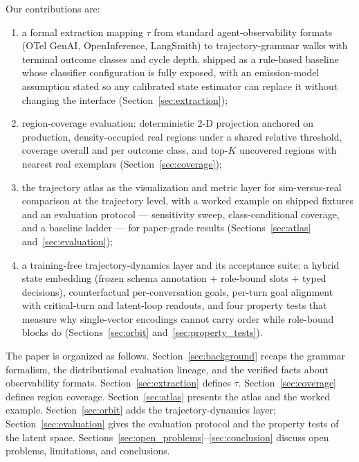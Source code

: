 Our contributions are:
\begin{enumerate}
  \item a formal extraction mapping $\tau$ from standard agent-observability formats
        (OTel GenAI, OpenInference, LangSmith) to trajectory-grammar walks with terminal
        outcome classes and cycle depth, shipped as a rule-based baseline whose classifier
        configuration is fully exposed, with an emission-model assumption stated so any
        calibrated state estimator can replace it without changing the interface
        (Section~\ref{sec:extraction});
  \item region-coverage evaluation: deterministic 2-D projection anchored on production,
        density-occupied real regions under a shared relative threshold, coverage
        overall and per outcome class, and top-$K$ uncovered regions with nearest real
        exemplars (Section~\ref{sec:coverage});
  \item the trajectory atlas as the visualization and metric layer for sim-versus-real
        comparison at the trajectory level, with a worked example on shipped fixtures and an
        evaluation protocol --- sensitivity sweep, class-conditional coverage, and a baseline
        ladder --- for paper-grade results (Sections~\ref{sec:atlas}
        and~\ref{sec:evaluation});
  \item a training-free trajectory-dynamics layer and its acceptance suite: a hybrid state
        embedding (frozen schema annotation + role-bound slots + typed decisions),
        counterfactual per-conversation goals, per-turn goal alignment with critical-turn and
        latent-loop readouts, and four property tests that measure why single-vector
        encodings cannot carry order while role-bound blocks do
        (Sections~\ref{sec:orbit} and~\ref{sec:property_tests}).
\end{enumerate}

The paper is organized as follows.
Section~\ref{sec:background} recaps the grammar formalism, the distributional evaluation
lineage, and the verified facts about observability formats.
Section~\ref{sec:extraction} defines $\tau$.
Section~\ref{sec:coverage} defines region coverage.
Section~\ref{sec:atlas} presents the atlas and the worked example.
Section~\ref{sec:orbit} adds the trajectory-dynamics layer; Section~\ref{sec:evaluation}
gives the evaluation protocol and the property tests of the latent space.
Sections~\ref{sec:open_problems}--\ref{sec:conclusion} discuss open problems, limitations,
and conclusions.
